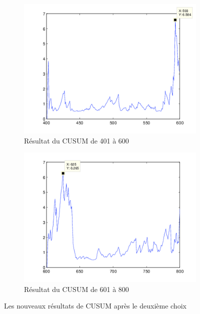 \documentclass[french,11pt,notitlepage]{report}
\begin{document}
	\begin{figure}[hp]
		\begin{subfigure}[t]{.49\textwidth}
		  \includegraphics[width=\linewidth,height=.24\textheight]{mle121.png}
			\caption{Résultat du CUSUM de 401 à 600}
			\label{mle121}
		\end{subfigure}
		\hfill
		\begin{subfigure}[t]{.49\textwidth}
			\includegraphics[width=\linewidth,height=.24\textheight]{mle122.png}
			\caption{Résultat du CUSUM de 601 à 800}
			\label{mle122}
		\end{subfigure} 
	\caption{Les nouveaux résultats de CUSUM après le deuxième choix}
	\label{testdikt3}
	\end{figure}
	
\end{document}

